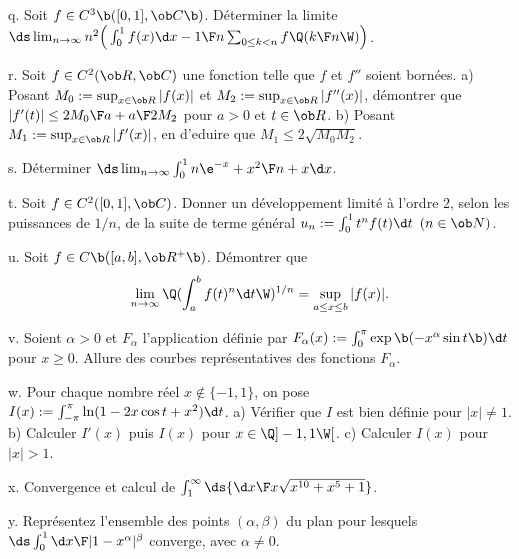 \exo [Level=1,Fight=4,Learn=2,Field=\Intégration,Type=\Others,Origin=\MP] q. 
Soit $f\in\sc C^3\b([0,1],\ob C\b)$. Déterminer la limite $\ds\lim_{n\to\infty}n^2\Big(\int_0^1f(x)\d x-{1\F n}\sum_{0\le k<n}f\Q({k\F n}\W)\Big)$. 

\exo [Level=1,Fight=3,Learn=2,Field=\Intégration,Type=\Colles,Origin=\MP] r. 
Soit $f\in\sc C^2(\ob R,\ob C)$ une fonction telle que $f$ et $f''$ soient bornées. \pn
a) Posant $M_0:=\sup_{x\in\ob R}|f(x)|$ et $M_2:=\sup_{x\in\ob R}|f''(x)|$, 
démontrer que $|f'(t)|\le {2M_0\F a}+{a\F2}M_2$ pour $a>0$ et $t\in\ob R$. \pn
b) Posant $M_1:=\sup_{x\in\ob R}|f'(x)|$, en d'eduire que $M_1\le 2\sqrt{M_0M_2}$. 


\exo [Level=1,Fight=2,Learn=1,Field=\Intégration,Type=\Exercices,Origin=\MP] s. 
Déterminer $\ds \lim_{n\to\infty}\int_0^1{n\e^{-x}+x^2\F n+x}\d x$. 

\exo [Level=1,Fight=1,Learn=1,Field=\Intégration,Type=\Exercices,Origin=\MP] t. 
Soit $f\in\sc C^2([0,1],\ob C)$. 
Donner un développement limité à l'ordre $2$, selon les puissances de $1/n$, 
de la suite de terme général $u_n:=\int_0^1t^nf(t)\d t\ \,(n\in\ob N)$. 

\exo [Level=1,Fight=3,Learn=2,Field=\Intégration,Type=\Others,Origin=\MP] u. 
Soit $f\in\sc C\b([a,b],\ob R^+\b)$. Démontrer que 
$$
\lim_{n\to\infty}\Q(\int_a^bf(t)^n\d t\W)^{1/n}=\sup_{a\le x\le b}|f(x)|. 
$$

\exo [Level=2,Fight=1,Learn=1,Field=\FonctionsDéfiniesParUneIntégrale,Type=\Colles,Origin=\MP] v. 
Soient $\alpha>0$ et $F_\alpha$ l'application définie 
par $F_\alpha(x):=\int_0^\pi\exp\b(-x^\alpha\sin t\b)\d t$ 
pour $x\ge 0$. \pn 
Allure des courbes représentatives des fonctions $F_\alpha$. 

\exo [Level=2,Fight=3,Learn=2,Field=\FonctionsDéfiniesParUneIntégrale,Type=\TravauxDirigés,Origin=\MP,Indication={c) étudier $I(1/x)$.}] w. 
Pour chaque nombre réel $x\notin\{-1,1\}$, 
on pose $I(x):=\int_{-\pi}^\pi\ln(1-2x\cos t+x^2)\d t$. \pn
a) Vérifier que $I$ est bien définie pour $|x|\neq1$. \pn 
b) Calculer $I'(x)$ puis $I(x)$ pour $x\in\Q]-1,1\W[$. \pn
c) Calculer $I(x)$ pour $|x|>1$. 

\exo [Level=2,Fight=4,Learn=2,Field=\IntégralesGénéralisées,Type=\Cours,Origin=] x. 
Convergence et calcul de $\int_1^\infty\ds{\d x\F x\sqrt{x^{10}+x^5+1}}$. 

\exo [Level=2,Fight=1,Learn=1,Field=\IntégralesGénéralisées,Type=\TravauxDirigés,Origin=] y. 
Représentez l'ensemble des points $(\alpha,\beta)$ du plan pour lesquels 
$\ds\int_0^1{\d x\F|1-x^\alpha|^\beta}$ converge, avec $\alpha\neq0$. 

